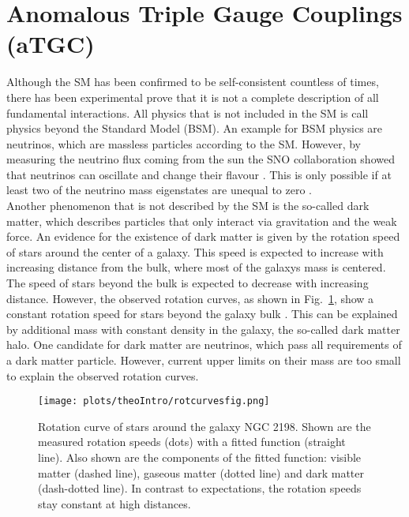\section{Anomalous Triple Gauge Couplings (aTGC)}
\label{sec:aTGC}

Although the SM has been confirmed to be self-consistent countless of times, there has been experimental prove that it is not a complete description of all fundamental interactions. All physics that is not included in the SM is call physics beyond the Standard Model (BSM). An example for BSM physics are neutrinos, which are massless particles according to the SM. However, by measuring the neutrino flux coming from the sun the SNO collaboration showed that neutrinos can oscillate and change their flavour \cite{SNO}. This is only possible if at least two of the neutrino mass eigenstates are unequal to zero \cite{}.\\
Another phenomenon that is not described by the SM is the so-called dark matter, which describes particles that only interact via gravitation and the weak force. An evidence for the existence of dark matter is given by the rotation speed of stars around the center of a galaxy. This speed is expected to increase with increasing distance from the bulk, where most of the galaxys mass is centered. The speed of stars beyond the bulk is expected to decrease with increasing distance. However, the observed rotation curves, as shown in Fig.~\ref{fig:theo:rotcurves}, show a constant rotation speed for stars beyond the galaxy bulk \cite{rotcurves}. This can be explained by additional mass with constant density in the galaxy, the so-called dark matter halo. One candidate for dark matter are neutrinos, which pass all requirements of a dark matter particle. However, current upper limits on their mass are too small to explain the observed rotation curves.
\begin{figure}
	\centering
	\texttt{[image: plots/theoIntro/rotcurvesfig.png]}
	\caption[Rotation curve of stars around the galaxy NGC 2198.]{Rotation curve of stars around the galaxy NGC 2198. Shown are the measured rotation speeds (dots) with a fitted function (straight line). Also shown are the components of the fitted function: visible matter (dashed line), gaseous matter (dotted line) and dark matter (dash-dotted line). In contrast to expectations, the rotation speeds stay constant at high distances.}
	\label{fig:theo:rotcurves}
\end{figure}

